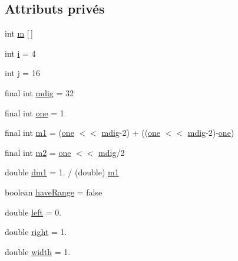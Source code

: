 \subsection*{Attributs privés}
\begin{DoxyCompactItemize}
\item 
int \hyperlink{classjnt_1_1scimark2_1_1Random_aed102d9fc6ee4e00f6ec50870b5ad88c}{m} \mbox{[}$\,$\mbox{]}
\item 
int \hyperlink{classjnt_1_1scimark2_1_1Random_a044347a46cf3161801a3739a2f249e66}{i} = 4
\item 
int \hyperlink{classjnt_1_1scimark2_1_1Random_a7d323c56dc4af7c9914e08175665cbcb}{j} = 16
\item 
final int \hyperlink{classjnt_1_1scimark2_1_1Random_ae9ade787ad441153ed665875e62030be}{mdig} = 32
\item 
final int \hyperlink{classjnt_1_1scimark2_1_1Random_a1d4281d838c46418fd2d30a4f1d52cf0}{one} = 1
\item 
final int \hyperlink{classjnt_1_1scimark2_1_1Random_ab7e096525b55f7e9368ba7aa4bffe41b}{m1} = (\hyperlink{classjnt_1_1scimark2_1_1Random_a1d4281d838c46418fd2d30a4f1d52cf0}{one} $<$$<$ \hyperlink{classjnt_1_1scimark2_1_1Random_ae9ade787ad441153ed665875e62030be}{mdig}-\/2) + ((\hyperlink{classjnt_1_1scimark2_1_1Random_a1d4281d838c46418fd2d30a4f1d52cf0}{one} $<$$<$ \hyperlink{classjnt_1_1scimark2_1_1Random_ae9ade787ad441153ed665875e62030be}{mdig}-\/2)-\/\hyperlink{classjnt_1_1scimark2_1_1Random_a1d4281d838c46418fd2d30a4f1d52cf0}{one})
\item 
final int \hyperlink{classjnt_1_1scimark2_1_1Random_a65a1436055bda1c6e25523e824e5373d}{m2} = \hyperlink{classjnt_1_1scimark2_1_1Random_a1d4281d838c46418fd2d30a4f1d52cf0}{one} $<$$<$ \hyperlink{classjnt_1_1scimark2_1_1Random_ae9ade787ad441153ed665875e62030be}{mdig}/2
\item 
double \hyperlink{classjnt_1_1scimark2_1_1Random_ad3888251b40ce8ae37a68b5b2e2bd0c5}{dm1} = 1. / (double) \hyperlink{classjnt_1_1scimark2_1_1Random_ab7e096525b55f7e9368ba7aa4bffe41b}{m1}
\item 
boolean \hyperlink{classjnt_1_1scimark2_1_1Random_a528187285b1330b8a017e2064118e868}{have\-Range} = false
\item 
double \hyperlink{classjnt_1_1scimark2_1_1Random_a3d63c681768d9fba34385c730b12de22}{left} = 0.
\item 
double \hyperlink{classjnt_1_1scimark2_1_1Random_a61abe62a2fb5de3294a2c231268bf893}{right} = 1.
\item 
double \hyperlink{classjnt_1_1scimark2_1_1Random_a9d0d92bf119171b4a77f7af5bd48693b}{width} = 1.
\end{DoxyCompactItemize}


